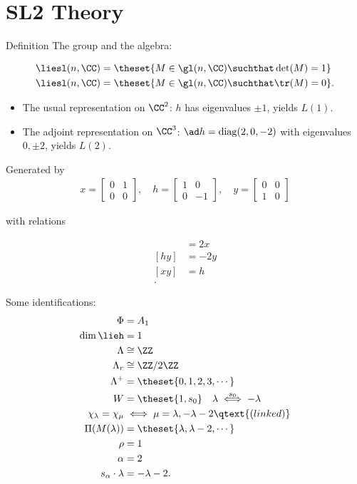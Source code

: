 \hypertarget{sl2-theory}{%
\section{SL2 Theory}\label{sl2-theory}}

Definition The group and the algebra:

\begin{align*}
\liesl(n, \CC)     &= \theset{M \in \gl(n, \CC) \suchthat \det(M) = 1} \\
\liesl(n, \CC)  &= \theset{M \in \gl(n, \CC) \suchthat \tr(M) = 0}
.\end{align*}

\begin{itemize}
\tightlist
\item
  The usual representation on \(\CC^2\): \(h\) has eigenvalues
  \(\pm 1\), yields \(L(1)\).
\item
  The adjoint representation on \(\CC^3\):
  \(\ad h = \mathrm{diag}(2, 0, -2)\) with eigenvalues \(0, \pm 2\),
  yields \(L(2)\).
\end{itemize}

Generated by \begin{align*}
x =
\begin{bmatrix}
0 & 1 \\
0 & 0
\end{bmatrix}
,\quad
h =
\begin{bmatrix}
1 & 0 \\
0 & -1
\end{bmatrix}
,\quad
y =
\begin{bmatrix}
0 & 0 \\
1 & 0
\end{bmatrix}
\end{align*}

with relations

\begin{align*}
[hx] &= 2x \\
[hy] &= -2y \\
[xy] &= h \\
.\end{align*}

Some identifications: \begin{align*}
\Phi &= A_1 \\
\dim \lieh &= 1\\
\Lambda &\cong \ZZ \\
\Lambda_r & \cong \ZZ/2\ZZ \\
\Lambda^+ &= \theset{0, 1, 2, 3, \cdots} \\
W &= \theset{1, s_0} \quad \lambda \overset{s_0}\iff -\lambda \\
\chi_\lambda = \chi_\mu &\iff \mu = \lambda, -\lambda-2 \qtext{(linked)}\\
\Pi(M(\lambda)) &= \theset{\lambda, \lambda-2, \cdots} \\
\rho &= 1 \\
\alpha &= 2 \\
s_\alpha \cdot \lambda &= - \lambda - 2
.\end{align*}

